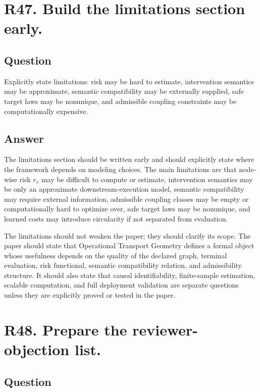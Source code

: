 \documentclass[11pt,a4paper]{article}
\begin{document}
\section*{R47. Build the limitations section early.}

\subsection*{Question}

Explicitly state limitations: risk may be hard to estimate, intervention semantics may be approximate, semantic compatibility may be externally supplied, safe target laws may be nonunique, and admissible coupling constraints may be computationally expensive.

\subsection*{Answer}

The limitations section should be written early and should explicitly state where the framework depends on modeling choices. The main limitations are that node-wise risk \(r_v\) may be difficult to compute or estimate, intervention semantics may be only an approximate downstream-execution model, semantic compatibility may require external information, admissible coupling classes may be empty or computationally hard to optimize over, safe target laws may be nonunique, and learned costs may introduce circularity if not separated from evaluation.

The limitations should not weaken the paper; they should clarify its scope. The paper should state that Operational Transport Geometry defines a formal object whose usefulness depends on the quality of the declared graph, terminal evaluation, risk functional, semantic compatibility relation, and admissibility structure. It should also state that causal identifiability, finite-sample estimation, scalable computation, and full deployment validation are separate questions unless they are explicitly proved or tested in the paper.

\section*{R48. Prepare the reviewer-objection list.}

\subsection*{Question}
\end{document}
